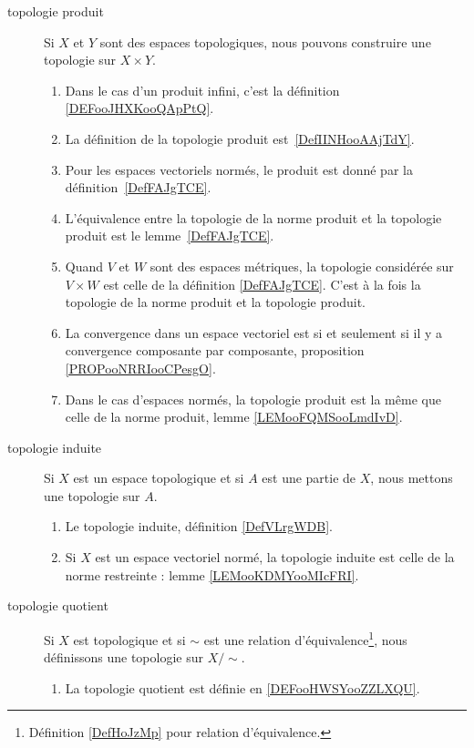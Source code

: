        \label{THEMEooYRIWooDXZnhX}
\begin{description}
	\item[topologie produit]
		Si \( X\) et \( Y\) sont des espaces topologiques, nous pouvons construire une topologie sur \( X\times Y\).
		\begin{enumerate}
			\item
			      Dans le cas d'un produit infini, c'est la définition \ref{DEFooJHXKooQApPtQ}.
			\item
			      La définition de la topologie produit est~\ref{DefIINHooAAjTdY}.
			\item
			      Pour les espaces vectoriels normés, le produit est donné par la définition~\ref{DefFAJgTCE}.
			\item
			      L'équivalence entre la topologie de la norme produit et la topologie produit est le lemme~\ref{DefFAJgTCE}.
			\item
			      Quand \( V\) et \( W\) sont des espaces métriques, la topologie considérée sur \( V\times W\) est celle de la définition \ref{DefFAJgTCE}. C'est à la fois la topologie de la norme produit et la topologie produit.
			\item
			      La convergence dans un espace vectoriel est si et seulement si il y a convergence composante par composante, proposition \ref{PROPooNRRIooCPesgO}.
			\item Dans le cas d'espaces normés, la topologie produit est la même que celle de la norme produit, lemme \ref{LEMooFQMSooLmdIvD}.
		\end{enumerate}
	\item[topologie induite]
		Si \( X\) est un espace topologique et si \( A\) est une partie de \( X\), nous mettons une topologie sur \( A\).
		\begin{enumerate}
			\item Le topologie induite, définition \ref{DefVLrgWDB}.
			\item Si \( X\) est un espace vectoriel normé, la topologie induite est celle de la norme restreinte : lemme \ref{LEMooKDMYooMIcFRI}.
		\end{enumerate}
	\item[topologie quotient]
		Si \( X\) est topologique et si \( \sim\) est une relation d'équivalence\footnote{Définition \ref{DefHoJzMp} pour relation d'équivalence.}, nous définissons une topologie sur \( X/\sim\).
		\begin{enumerate}
			\item La topologie quotient est définie en \ref{DEFooHWSYooZZLXQU}.

\end{enumerate}
\end{description}
